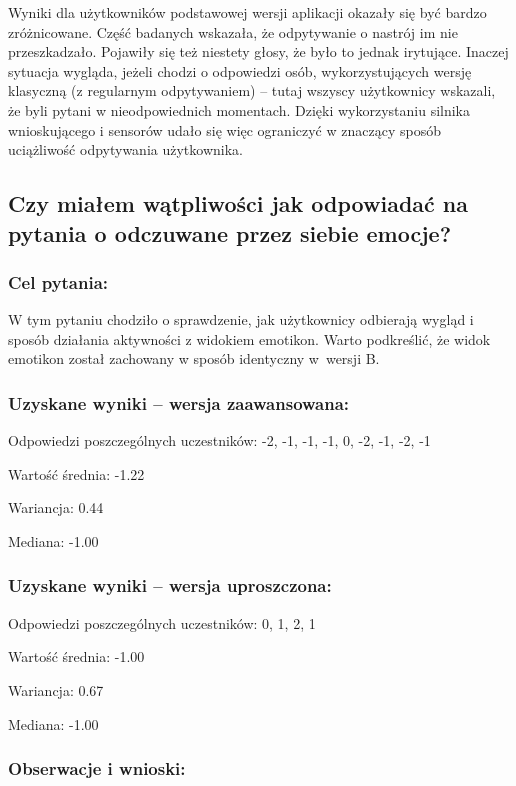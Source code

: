 	Wyniki dla użytkowników podstawowej wersji aplikacji okazały się być bardzo zróżnicowane. Część badanych wskazała, że odpytywanie o nastrój im nie przeszkadzało. Pojawiły się też niestety głosy, że było to jednak irytujące. Inaczej sytuacja wygląda, jeżeli chodzi o odpowiedzi osób, wykorzystujących wersję klasyczną (z regularnym odpytywaniem) -- tutaj wszyscy użytkownicy wskazali, że byli pytani w nieodpowiednich momentach. Dzięki wykorzystaniu silnika wnioskującego i sensorów udało się więc ograniczyć w znaczący sposób uciążliwość odpytywania użytkownika.
	
	
	\subsection{Czy miałem wątpliwości jak odpowiadać na pytania o odczuwane przez siebie emocje?}
	
	\subsubsection{Cel pytania:}
	
	W tym pytaniu chodziło o sprawdzenie, jak użytkownicy odbierają wygląd i sposób działania aktywności z widokiem emotikon. Warto podkreślić, że widok emotikon został zachowany w sposób identyczny w~wersji B.
	
	\subsubsection{Uzyskane wyniki -- wersja zaawansowana:}
	
	Odpowiedzi poszczególnych uczestników: -2, -1, -1, -1, 0, -2, -1, -2, -1
	
	Wartość średnia: -1.22
	
	Wariancja: 0.44
	
	Mediana: -1.00
	
	\subsubsection{Uzyskane wyniki -- wersja uproszczona:}
	
	Odpowiedzi poszczególnych uczestników: 0, 1, 2, 1
	
	Wartość średnia: -1.00
	
	Wariancja: 0.67
	
	Mediana: -1.00
	
	\subsubsection{Obserwacje i wnioski:}
	
